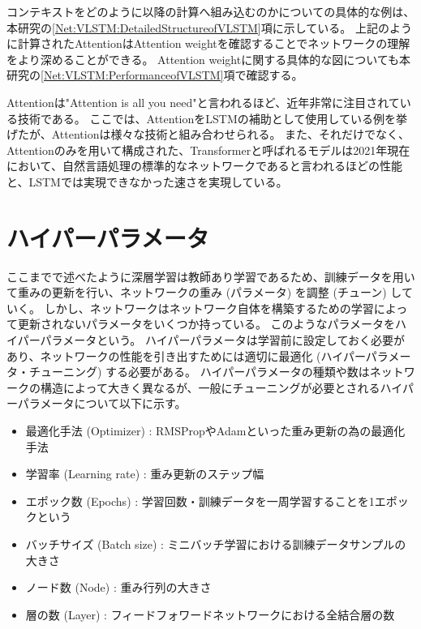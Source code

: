 コンテキストをどのように以降の計算へ組み込むのかについての具体的な例は、本研究の\ref{Net:VLSTM:DetailedStructureofVLSTM}項に示している。
上記のように計算されたAttentionはAttention weightを確認することでネットワークの理解をより深めることができる。
Attention weightに関する具体的な図についても本研究の\ref{Net:VLSTM:PerformanceofVLSTM}項で確認する。

Attentionは"Attention is all you need\cite{AttentionIsAllYouNeed}"と言われるほど、近年非常に注目されている技術である。
ここでは、AttentionをLSTMの補助として使用している例を挙げたが、Attentionは様々な技術と組み合わせられる。
また、それだけでなく、Attentionのみを用いて構成された、Transformerと呼ばれるモデルは2021年現在において、自然言語処理の標準的なネットワークであると言われるほどの性能と、LSTMでは実現できなかった速さを実現している。


\section{ハイパーパラメータ} \label{DL:HyperParameter}

ここまでで述べたように深層学習は教師あり学習であるため、訓練データを用いて重みの更新を行い、ネットワークの重み (パラメータ) を調整 (チューン) していく。
しかし、ネットワークはネットワーク自体を構築するための学習によって更新されないパラメータをいくつか持っている。
このようなパラメータをハイパーパラメータという。
ハイパーパラメータは学習前に設定しておく必要があり、ネットワークの性能を引き出すためには適切に最適化 (ハイパーパラメータ・チューニング) する必要がある。
ハイパーパラメータの種類や数はネットワークの構造によって大きく異なるが、一般にチューニングが必要とされるハイパーパラメータについて以下に示す。

\begin{itemize}
  \item 最適化手法 (Optimizer) : RMSPropやAdamといった重み更新の為の最適化手法
  \item 学習率 (Learning rate) : 重み更新のステップ幅
  \item エポック数 (Epochs) : 学習回数・訓練データを一周学習することを1エポックという
  \item バッチサイズ (Batch size) : ミニバッチ学習における訓練データサンプルの大きさ
  \item ノード数 (Node) : 重み行列の大きさ
  \item 層の数 (Layer) : フィードフォワードネットワークにおける全結合層の数
\end{itemize}

